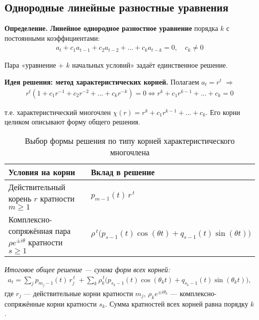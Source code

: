 \subsection{Однородные линейные разностные уравнения}\label{sec:homogeneous}


\textbf{Определение.} \textbf{Линейное однородное разностное уравнение} порядка $k$ с постоянными коэффициентами:
\begin{align}
a_t + c_1 a_{t-1} + c_2 a_{t-2} + \dots + c_k a_{t-k} = 0, \quad c_k \neq 0
\end{align}

Пара «уравнение + $k$ начальных условий» задаёт единственное решение.

\textbf{Идея решения: метод характеристических корней.} Полагаем $a_t = r^t$ $\Rightarrow$
\begin{align}
r^t (1 + c_1 r^{-1} + c_2 r^{-2} + \dots + c_k r^{-k}) = 0 \iff r^k + c_1 r^{k-1} + \dots + c_k = 0
\end{align}

т.е. характеристический многочлен $\chi(r) = r^k + c_1 r^{k-1} + \dots + c_k$. Его корни целиком описывают форму общего решения.

\begin{NotationSection}
\end{NotationSection}

\begin{table}[h!]
\centering
\caption{Выбор формы решения по типу корней характеристического многочлена}
\begin{tabular}{|l|l|}
\hline
\textbf{Условия на корни} & \textbf{Вклад в решение} \\
\hline
Действительный корень $r$ кратности $m\ge 1$ &
$p_{m-1}(t)\, r^{\,t}$ \\
\hline
Комплексно-сопряжённая пара $\rho e^{\pm i\theta}$ кратности $s\ge 1$ &
$\rho^{\,t}\big(p_{s-1}(t)\cos(\theta t)+q_{s-1}(t)\sin(\theta t)\big)$ \\
\hline
\end{tabular}

\vspace{0.5em}
\emph{Итоговое общее решение — сумма форм всех корней:}
\begin{align*}
a_t = \sum_{j} p_{m_j-1}(t)\, r_j^{\,t}
\; + \sum_{k} \rho_k^{\,t}\big(p_{s_k-1}(t)\cos(\theta_k t)+q_{s_k-1}(t)\sin(\theta_k t)\big),
\end{align*}
где $r_j$ — действительные корни кратности $m_j$, $\rho_k e^{\pm i\theta_k}$ — комплексно-сопряжённые корни кратности $s_k$.
Сумма кратностей всех корней равна порядку $k$.
\end{table}

